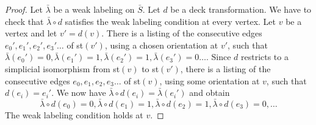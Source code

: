 \documentclass[12pt]{article}
\theoremstyle{definition}
\begin{document}
\begin{proof}
    Let $\bar\lambda$ be a weak labeling on $\bar S$. Let $d$ be a deck transformation. We have to check that $\bar\lambda\circ d$ satisfies the weak labeling condition at every vertex. Let $v$ be a vertex and let $v'=d(v)$. There is a listing of the consecutive edges $e_0', e_1', e_2', e_3' \ldots$ of st$(v')$, using a chosen orientation at $v'$, such that $\bar\lambda(e_0')=0, \bar\lambda(e_1')=1, \bar\lambda(e_2')=1, \bar\lambda(e_3')=0 \ldots$. Since $d$ restricts to a simplicial isomorphism from st$(v)$ to st$(v')$, there is a listing of the consecutive edges $e_0, e_1, e_2, e_3 \ldots$ of st$(v)$, using some orientation at $v$, such that $d(e_i)=e_i'$. We now have $\bar\lambda\circ d(e_i)=\bar\lambda(e_i')$ and obtain
    $$\bar\lambda\circ d(e_0)=0, \bar\lambda\circ d(e_1)=1, \bar\lambda\circ d(e_2)=1, \bar\lambda\circ d(e_3)=0, \ldots$$ 
    The weak labeling condition holds at $v$.
\end{proof}
\end{document}
